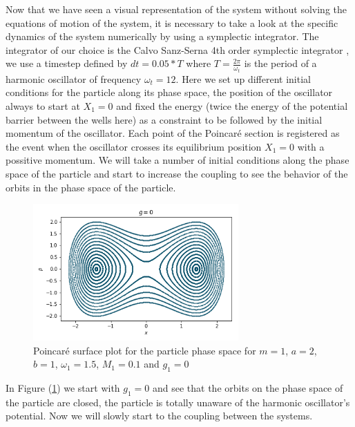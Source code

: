 Now that we have seen a visual representation of the system without solving the equations of motion of the system, it is necessary to take a look at the specific dynamics of the system numerically by using a symplectic integrator. The integrator of our choice is the Calvo Sanz-Serna 4th order symplectic integrator \cite{gray1994symplectic}\cite{sanz1993symplectic}\cite{rackauckas2017differentialequations}, we use a timestep defined by $dt=0.05*T$ where $T=\frac{2\pi}{\omega_t}$ is the period of a harmonic oscillator of frequency $\omega_t=12$. Here we set up different initial conditions for the particle along its phase space, the position of the oscillator always to start at $X_1=0$ and fixed the energy (twice the energy of the potential barrier between the wells here) as a constraint to be followed by the initial momentum of the oscillator. Each point of the Poincaré section is registered as the event when the oscillator crosses its equilibrium position $X_1=0$ with a possitive momentum. We will take a number of initial conditions along the phase space of the particle and start to increase the coupling to see the behavior of the orbits in the phase space of the particle.

\begin{figure}[H]
\centering
\includegraphics[width=0.7\textwidth]{Figures/poincare_g0.png}
\caption{Poincaré surface plot for the particle phase space for $m=1$, $a=2$, $b=1$, $\omega_1=1.5$, $M_1=0.1$ and $g_1=0$
}
\label{fig:poinc_g0}
\end{figure}

In Figure (\ref{fig:poinc_g0}) we start with $g_1=0$ and see that the orbits on the phase space of the particle are closed, the particle is totally unaware of the harmonic oscillator's potential. Now we will slowly start to  the coupling between the systems.\par 


